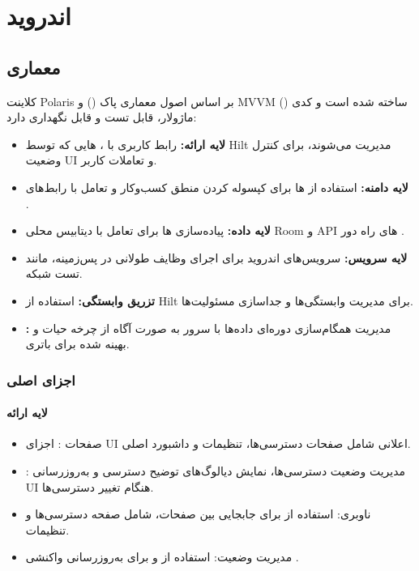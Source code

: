 \chapter{اندروید}
\section{معماری }
کلاینت Polaris بر اساس اصول معماری پاک () و MVVM () ساخته شده است و کدی ماژولار، قابل تست و قابل نگهداری دارد:

\begin{itemize}
    \item \textbf{لایه ارائه:} رابط کاربری با ، هایی که توسط Hilt مدیریت می‌شوند، برای کنترل وضعیت UI و تعاملات کاربر.
    \item \textbf{لایه دامنه:} استفاده از  ها برای کپسوله کردن منطق کسب‌وکار و تعامل با رابط‌های .
    \item \textbf{لایه داده:} پیاده‌سازی  ها برای تعامل با دیتابیس محلی Room و API های راه دور .
    \item \textbf{لایه سرویس:} سرویس‌های اندروید برای اجرای وظایف طولانی در پس‌زمینه، مانند تست شبکه.
    \item \textbf{تزریق وابستگی:} استفاده از Hilt برای مدیریت وابستگی‌ها و جداسازی مسئولیت‌ها.
    \item \textbf{:} مدیریت همگام‌سازی دوره‌ای داده‌ها با سرور به صورت آگاه از چرخه حیات و بهینه شده برای باتری.
\end{itemize}

\subsection{اجزای اصلی}

\subsubsection{لایه ارائه}
\begin{itemize}
    \item صفحات : اجزای UI اعلانی شامل صفحات دسترسی‌ها، تنظیمات و داشبورد اصلی.
    \item {}: مدیریت وضعیت دسترسی‌ها، نمایش دیالوگ‌های توضیح دسترسی و به‌روزرسانی UI هنگام تغییر دسترسی‌ها.
    \item ناوبری: استفاده از  برای جابجایی بین صفحات، شامل صفحه دسترسی‌ها و تنظیمات.
    \item مدیریت وضعیت: استفاده از  و  برای به‌روزرسانی واکنشی .
\end{itemize}

